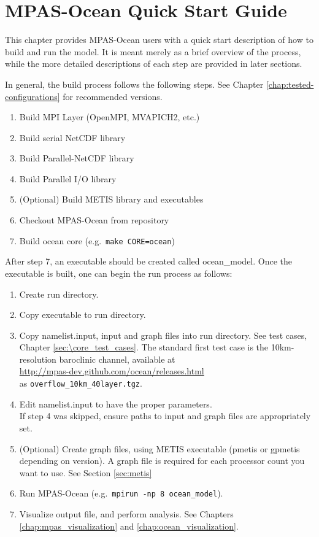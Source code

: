 \chapter{MPAS-Ocean Quick Start Guide}
\label{chap:quick_start}

This chapter provides MPAS-Ocean users with a quick start description of how to
build and run the model. It is meant merely as a brief overview of the process,
while the more detailed descriptions of each step are provided in later
sections.

In general, the build process follows the following steps.  See Chapter 
\ref{chap:tested-configurations} for recommended versions.

\begin{enumerate}
	\item Build MPI Layer (OpenMPI, MVAPICH2, etc.)
	\item Build serial NetCDF library
	\item Build Parallel-NetCDF library
	\item Build Parallel I/O library
	\item (Optional) Build METIS library and executables
	\item Checkout MPAS-Ocean from repository
	\item Build ocean core (e.g.\ {\tt make CORE=ocean})
\end{enumerate}

After step 7, an executable should be created called ocean\_model. Once the executable is built, one can begin the run process as follows:

\begin{enumerate}
	\item Create run directory.
	\item Copy executable to run directory.
	\item Copy namelist.input, input and graph files into run directory.  See test cases, Chapter \ref{sec:\core_test_cases}.  The standard first test case is the 10km-resolution baroclinic channel, available at\\
 \url{http://mpas-dev.github.com/ocean/releases.html} \\
as {\tt overflow\_10km\_40layer.tgz}.
	\item Edit namelist.input to have the proper parameters. \\
		  If step 4 was skipped, ensure paths to input and graph files are appropriately set.
	\item (Optional) Create graph files, using METIS executable (pmetis or gpmetis depending on version).  A graph file is required for each processor count you want to use.  See Section \ref{sec:metis}
	\item Run MPAS-Ocean (e.g.\ {\tt mpirun -np 8 ocean\_model}).
	\item Visualize output file, and perform analysis.  See Chapters \ref{chap:mpas_visualization} and \ref{chap:ocean_visualization}.
\end{enumerate}
